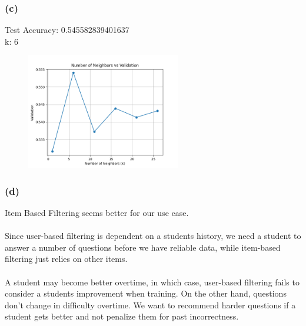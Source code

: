 \documentclass{article}
\begin{document}
\subsubsection{(c)}
Test Accuracy: 0.545582839401637\\
k: 6\\
\begin{figure}[H]
\centering
\includegraphics[width=0.6\textwidth]{figures/q1c.png}\\
\end{figure}

\subsubsection{(d)}
Item Based Filtering seems better for our use case.\\
\\
Since user-based filtering is dependent on a students history, we need a student to answer a number of questions before we have reliable data, while item-based filtering just relies on other items.\\
\\
A student may become better overtime, in which case, user-based filtering fails to consider a students improvement when training. On the other hand, questions don't change in difficulty overtime. We want to recommend harder questions if a student gets better and not penalize them for past incorrectness.\\
\\
\end{document}
